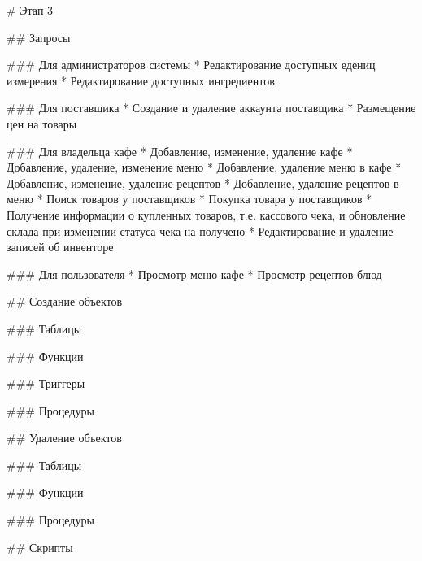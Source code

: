 \begin{markdown}
# Этап 3

## Запросы

### Для администраторов системы
* Редактирование доступных едениц измерения
* Редактирование доступных ингредиентов

### Для поставщика
* Создание и удаление аккаунта поставщика
* Размещение цен на товары

### Для владельца кафе
* Добавление, изменение, удаление кафе 
* Добавление, удаление, изменение меню
* Добавление, удаление меню в кафе
* Добавление, изменение, удаление рецептов
* Добавление, удаление рецептов в меню
* Поиск товаров у поставщиков
* Покупка товара у поставщиков
* Получение информации о купленных товаров, т.е. кассового чека, и обновление склада при изменении статуса чека на получено
* Редактирование и удаление записей об инвенторе

### Для пользователя
* Просмотр меню кафе
* Просмотр рецептов блюд

## Создание объектов

### Таблицы
\end{markdown}

\begin{markdown}
### Функции
\end{markdown}

\begin{markdown}
### Триггеры
\end{markdown}

\begin{markdown}
### Процедуры
\end{markdown}

\begin{markdown}
## Удаление объектов

### Таблицы
\end{markdown}


\begin{markdown}
### Функции
\end{markdown}

\begin{markdown}
### Процедуры
\end{markdown}

\begin{markdown}
## Скрипты
\end{markdown}
